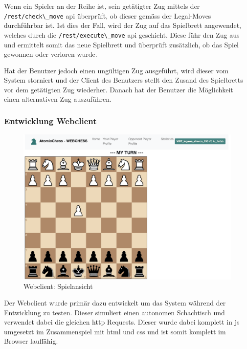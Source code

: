 Wenn ein Spieler an der Reihe ist, sein getätigter Zug mittels der
\passthrough{\lstinline!/rest/check\_move!} \gls{api} überprüft, ob
dieser gemäss der Legal-Moves durchführbar ist. Ist dies der Fall, wird
der Zug auf das Spielbrett angewendet, welches durch die
\passthrough{\lstinline!/rest/execute\_move!} \gls{api} geschieht. Diese
führ den Zug aus und ermittelt somit das neue Spielbrett und überprüft
zusätzlich, ob das Spiel gewonnen oder verloren wurde.

Hat der Benutzer jedoch einen ungültigen Zug ausgeführt, wird dieser vom
System storniert und der Client des Benutzers stellt den Zusand des
Spielbretts vor dem getätigten Zug wiederher. Danach hat der Benutzer
die Möglichkeit einen alternativen Zug auszuführen.

\hypertarget{entwicklung-webclient}{%
\subsubsection{Entwicklung Webclient}\label{entwicklung-webclient}}

\begin{figure}
\centering
\includegraphics{images/ATC_webclient.png}
\caption{Webclient: Spielansicht \label{ATC_webclient}}
\end{figure}

Der Webclient wurde primär dazu entwickelt um das System während der
Entwicklung zu testen. Dieser simuliert einen autonomen Schachtisch und
verwendet dabei die gleichen \gls{http} Requests. Dieser wurde dabei
komplett in \gls{js} umgesetzt im Zusammenspiel mit \gls{html} und
\gls{css} und ist somit komplett im Browser lauffähig.

